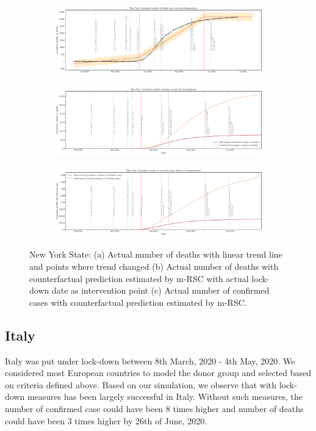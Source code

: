 \documentclass[final,authoryear,5p,times,twocolumn]{elsarticle}
\begin{document}
		\begin{figure}
			\centering
			\begin{subfigure}[b]{\textwidth}
				\centering
				\includegraphics[width=0.8\linewidth,height=0.2\textheight]{FIG10}
			\end{subfigure}
			
			\begin{subfigure}[b]{\textwidth}
				\centering
				\includegraphics[width=0.8\linewidth,height=0.2\textheight]{FIG11}
			\end{subfigure}

			\begin{subfigure}[b]{\textwidth}
				\centering
				\includegraphics[width=0.8\linewidth,height=0.2\textheight]{FIG12}
			\end{subfigure}

			\caption[New York]{New York State: (a) Actual number of deaths with linear trend line and points where trend changed (b) Actual number of deaths with counterfactual prediction estimated by m-RSC with actual lock-down date as intervention point (c) Actual number of confirmed cases with counterfactual prediction estimated by m-RSC.}
			\label{fig5} 
		\end{figure}
	
	
	\subsection{Italy}
	 Italy was put under lock-down between 8th March, 2020 - 4th May, 2020. We considered most European countries to model the donor group and selected based on criteria defined above. Based on our simulation, we observe that with lock-down measures  has been largely successful in Italy. Without such measures, the number of confirmed case could have been 8 times higher and number of deaths could have been 3 times higher by 26th of June, 2020.
	 
\end{document}

